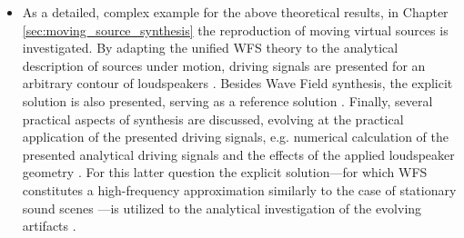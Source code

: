 \begin{itemize}
%
\item As a detailed, complex example for the above theoretical results, in Chapter \ref{sec:moving_source_synthesis} the reproduction of moving virtual sources is investigated.
By adapting the unified WFS theory to the analytical description of sources under motion, driving signals are presented for an arbitrary contour of loudspeakers \cite{Firtha2015:daga, firtha2016wave, doi:10.1121/1.4996126}.
Besides Wave Field synthesis, the explicit solution is also presented, serving as a reference solution \cite{Firtha2014:daga, Firtha2014:isma}.
Finally, several practical aspects of synthesis are discussed, evolving at the practical application of the presented driving signals, e.g. numerical calculation of the presented analytical driving signals and the effects of the applied loudspeaker geometry \cite{Firtha2018_daga_moving_source}.
For this latter question the explicit solution---for which WFS constitutes a high-frequency approximation similarly to the case of stationary sound scenes \cite{firtha2015sound}---is utilized to the analytical investigation of the evolving artifacts \cite{firtha2016:daga}.
\end{itemize}
